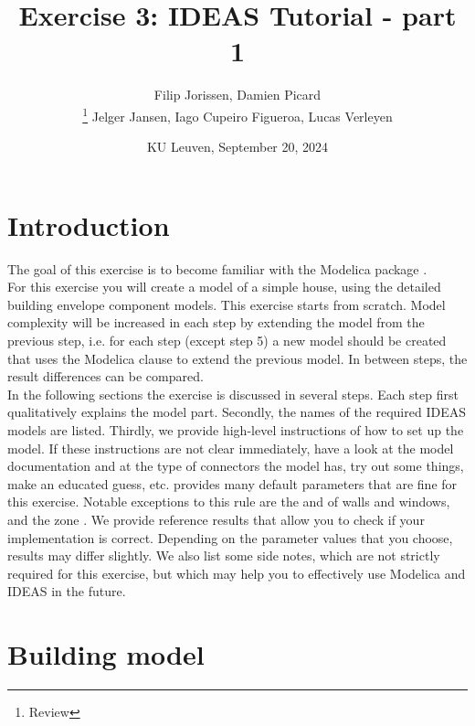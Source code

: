 \documentclass[10pt,a4paper]{article}
\begin{document}
\title{Exercise 3: IDEAS Tutorial - part 1}
\author{Filip Jorissen, Damien Picard\\ \thanks{Review}  Jelger Jansen, Iago Cupeiro Figueroa, Lucas Verleyen}
\date{KU Leuven, September 20, 2024}
\maketitle

\doclicenseThis

\section*{Introduction}
The goal of this exercise is to become familiar with the 
Modelica package . \\

For this exercise you will create a model of a simple house,
using the detailed building envelope component models.
This exercise starts from scratch. 
Model complexity will be increased in each step by 
extending the model from the previous step, i.e. for each step (except step 5) a new model should be created that uses
the Modelica  clause to extend the previous model.
In between steps, the result differences can be compared.\\


In the following sections the exercise is discussed 
in several steps. 
Each step first qualitatively explains the model part.
Secondly, the names of the required IDEAS models 
are listed.
Thirdly, we provide high-level instructions of how to
set up the model.
If these instructions are not clear immediately, 
have a look at the model documentation and at the type of
connectors the model has, 
try out some things, 
make an educated guess, etc.
 provides many default parameters that are fine for
this exercise. Notable exceptions to this rule are
the   and   of walls and windows, and the zone .
We provide reference results that allow you to check
if your implementation is correct. 
Depending on the parameter values that you choose, results
may differ slightly.
We also list some side notes, which are not strictly required for this
exercise, but which may help you to effectively use Modelica
and IDEAS in the future.

\newpage

\section{Building  model}
\end{document}
